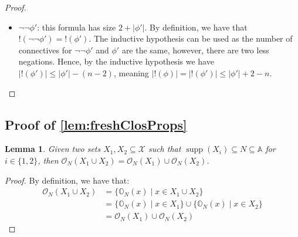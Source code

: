 \documentclass[10pt,a4paper]{article}
\newtheorem{lemma}[theorem]{Lemma}
\theoremstyle{definition}
\theoremstyle{remark}
\DeclareMathOperator{\supp}{supp}
\newcommand\Xcal{\mathcal{X}}
\newcommand\Atoms{\mathbb{A}}
\newcommand\orb[1][]{\mathcal{O}_{#1}}
\newcommand\orbs[1][]{\mathbb{O}_{#1}}
\renewcommand\S{N}
\begin{document}
\begin{proof}
\begin{itemize}
\begin{align*}
			&\le 2 + |\phi'| + |\vec u| - n
		\end{align*}
		A similar argument can be shown for $\lnot (\nu X(\vec x).\phi')(\vec u)$.
				\item $\lnot \lnot \phi'$: this formula has size $2 + |\phi'|$. 
		By definition, we have that $!(\lnot \lnot \phi') = !(\phi')$. 
		The inductive hypothesis can be used as the number of connectives for $\lnot \lnot \phi'$ and $\phi'$ are the same, however, there are two less negations. 
		Hence, by the inductive hypothesis we have $|!(\phi')| \le |\phi'| - (n - 2)$, 
		meaning $|!(\phi)| = |!(\phi')| \le |\phi'| + 2 - n $.
	\end{itemize}
\end{proof}

\subsection{Proof of  \cref{lem:freshClosProps}}

\begin{lemma}\label{lem:unionOrb2}
	Given two sets $X_1,X_2\subseteq \Xcal$ such that $\supp(X_i) \subseteq \S \subseteq \Atoms$ for $i \in \{1, 2\}$,
	then $\orb[\S](X_1 \cup X_2) = \orb[\S](X_1) \cup \orb[\S](X_2)$.
\end{lemma}

\begin{proof}
	By definition, we have that:
	\begin{align*}
		\orb[\S](X_1 \cup X_2) &= \{\orbs[\S](x) \mid x \in X_1 \cup X_2\} 
		\\ &= \{\orbs[\S](x) \mid x \in X_1\} \cup \{\orbs[\S](x) \mid x \in X_2\} 
		\\ &= \orb[\S](X_1) \cup \orb[\S](X_2)    
	\end{align*}
\end{proof}
\end{document}
